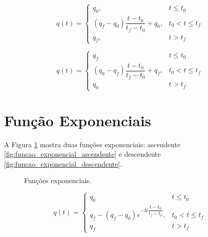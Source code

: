         \begin{equation} \label{eq:funcao_linear_ascendente}
            q(t) =
            \begin{cases}
                q_0 ,& t \leq t_0 \\
                (q_f - q_0)\dfrac{t - t_0}{t_f - t_0} + q_0 ,& t_0 < t \leq t_f \\
                q_f ,& t > t_f
            \end{cases}
        \end{equation}
        
        \begin{equation} \label{eq:funcao_linear_descendente}
            q(t) =
            \begin{cases}
                q_f & t \leq t_0 \\
                (q_0 - q_f)\dfrac{t - t_0}{t_f - t_0} + q_f ,& t_0 < t \leq t_f \\
                q_0 & t > t_f
            \end{cases}
        \end{equation}
    
    \section{Função Exponenciais} \label{sec:funcoes_exponenciais}
    
        A Figura \ref{fig:funcoes_exponenciais} mostra duas funções exponenciais: ascendente \ref{fig:funcao_exponencial_ascendente} e descendente \ref{fig:funcao_exponencial_descendente}.
    
        \begin{figure}[htb]
            \centering
            \caption{Funções exponenciais.} \label{fig:funcoes_exponenciais}
        \end{figure}
        
        \begin{equation} \label{eq:funcao_exponencial_ascendente}
            q(t) =
            \begin{cases}
                q_0 & t \leq t_0 \\
                q_f - (q_f - q_0) e^{-K\dfrac{t - t_0}{t_f - t_0}} ,& t_0 < t \leq t_f \\
                q_f & t > t_f
            \end{cases}
        \end{equation}
        
